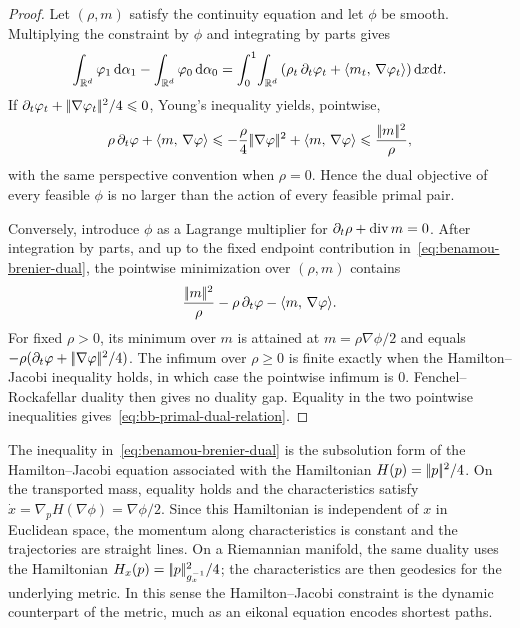 \begin{proof}
	Let $(\rho,m)$ satisfy the continuity equation and let $\phi$ be smooth. Multiplying the constraint by $\phi$ and integrating by parts gives
	\[
		\int_{\mathbb{R}^d}\varphi_1\,\mathrm{d}\alpha_1
		-
		\int_{\mathbb{R}^d}\varphi_0\,\mathrm{d}\alpha_0
		=
		\int_0^1\!\int_{\mathbb{R}^d}
		\left(\rho_t\,\partial_t\varphi_t+\langle m_t,\,\nabla\varphi_t\rangle\right)\mathrm{d} x\mathrm{d} t .
	\]
	If $\partial_t\varphi_t+|\!| \nabla\varphi_t |\!|^2/4\leqslant0$, Young's inequality yields, pointwise,
	\[
		\rho\,\partial_t\varphi+\langle m,\,\nabla\varphi\rangle
		\leqslant
		-\frac{\rho}{4}|\!| \nabla\varphi |\!|^2+\langle m,\,\nabla\varphi\rangle
		\leqslant
		\frac{|\!| m |\!|^2}{\rho},
	\]
	with the same perspective convention when $\rho=0$. Hence the dual objective of every feasible $\phi$ is no larger than the action of every feasible primal pair.

	Conversely, introduce $\phi$ as a Lagrange multiplier for $\partial_t\rho+\operatorname{div} m=0$. After integration by parts, and up to the fixed endpoint contribution in~\eqref{eq:benamou-brenier-dual}, the pointwise minimization over $(\rho,m)$ contains
	\[
		\frac{|\!| m |\!|^2}{\rho}-\rho\,\partial_t\varphi-\langle m,\,\nabla\varphi\rangle.
	\]
	For fixed $\rho>0$, its minimum over $m$ is attained at $m=\rho\nabla\phi/2$ and equals $-\rho(\partial_t\varphi+|\!| \nabla\varphi |\!|^2/4)$. The infimum over $\rho\geq0$ is finite exactly when the Hamilton--Jacobi inequality holds, in which case the pointwise infimum is $0$. Fenchel--Rockafellar duality then gives no duality gap. Equality in the two pointwise inequalities gives~\eqref{eq:bb-primal-dual-relation}.
\end{proof}

The inequality in~\eqref{eq:benamou-brenier-dual} is the subsolution form of the Hamilton--Jacobi equation associated with the Hamiltonian $H(p)=|\!| p |\!|^2/4$. On the transported mass, equality holds and the characteristics satisfy $\dot x=\nabla_pH(\nabla\phi)=\nabla\phi/2$. Since this Hamiltonian is independent of $x$ in Euclidean space, the momentum along characteristics is constant and the trajectories are straight lines. On a Riemannian manifold, the same duality uses the Hamiltonian $H_x(p)=|\!| p |\!|_{g_x^{-1}}^2/4$; the characteristics are then geodesics for the underlying metric. In this sense the Hamilton--Jacobi constraint is the dynamic counterpart of the metric, much as an eikonal equation encodes shortest paths.

